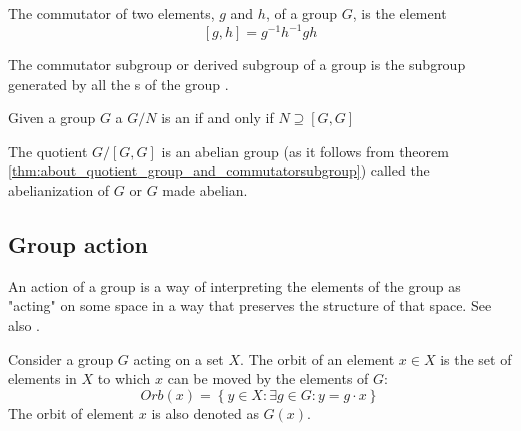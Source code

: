 \begin{appendices}
\begin{definition}[Commutator]
  The commutator of two elements, $g$ and $h$, of a group $G$, is the
  element \cite{wiki:commutator}
  \[
  \left[g, h\right] = g^{-1} h^{-1} g h
  \]
  \label{def:commutator}
\end{definition}

\begin{definition}
  The commutator subgroup or derived subgroup of a group is the
  subgroup generated by all the s of the group 
  \cite{wiki:commutatorsubgroup}.
  \label{def:commutatorsubgroup}
\end{definition}

\begin{theorem}
  Given a group $G$ a  $G/N$ is an
   if and only if $N \supseteq \left[G,
    G\right]$
  \cite{wiki:commutatorsubgroup}
  \label{thm:about_quotient_group_and_commutatorsubgroup}
\end{theorem}

\begin{definition}[Abelianization]
  The quotient $G/[G,G]$ is an abelian group
  (as it follows from theorem \ref{thm:about_quotient_group_and_commutatorsubgroup})
  called the abelianization of $G$ or $G$ made abelian.
  \cite{wiki:commutatorsubgroup}
  \label{def:abelianization}
\end{definition}

\subsection{Group action}

\begin{definition}[Action]
  An action of a group is a way of
  interpreting the elements of the 
  group as "acting" on some space in a way that preserves the structure
  of that space. See also \cite{wiki:groupaction}.
  \label{def:action}
\end{definition}

\begin{definition}[Orbit]
  Consider \cite{wiki:groupaction} a group $G$ acting on a set
  $X$. The orbit of an element $x \in X$ 
  is the set of elements in $X$ to which $x$ can be moved by the elements
  of $G$:
  \[
  Orb\left(x\right) = \left\{y \in X: \exists g \in G: y = g \cdot x \right\}
  \]
  The orbit of element $x$  is also denoted as $G\left(x\right)$.
  \label{def:orbit}
\end{definition}


\end{appendices}
